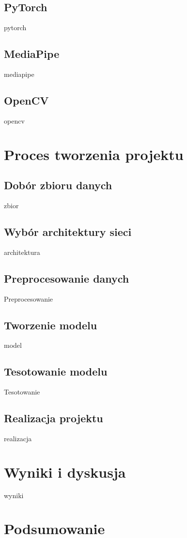 \documentclass[12pt]{article}
\begin{document}
\begin{sloppypar}
{  \subsection{PyTorch}
  {
    pytorch
  }
  \subsection{MediaPipe}
  {
    mediapipe
  
  }
  \subsection{OpenCV}
  {
    opencv
  }
}

\section{Proces tworzenia projektu}
{
  \subsection{Dobór zbioru danych}
  {
    zbior
  }
  \subsection{Wybór architektury sieci}
  {
    architektura
  }
  \subsection{Preprocesowanie danych}
  {
    Preprocesowanie
  }
  \subsection{Tworzenie modelu}
  {
    model
  }
  \subsection{Tesotowanie modelu}
  {
    Tesotowanie
  }
  \subsection{Realizacja projektu}
  {
    realizacja
  }
}

\section{Wyniki i dyskusja}
{
  wyniki
}

\section{Podsumowanie}
{
}
\end{sloppypar}
\end{document}
